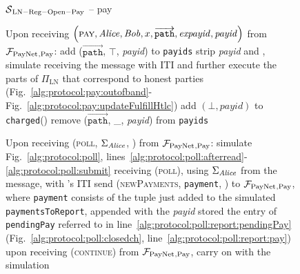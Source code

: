 \begin{figure}[!htbp]
\begin{simulatorbox}{$\mathcal{S}{}_{\mathrm{LN - Reg - Open - Pay}}$ -- pay}
\begin{algorithmic}[1]
      \State Upon receiving $\left(\textsc{pay}, \mathit{Alice}, \mathit{Bob}, x,
      \overrightarrow{\mathtt{path}}, \mathit{expayid}, \mathit{payid}\right)$
      from $\mathcal{F}_{\mathrm{PayNet}}{}_{\mathrm{, Pay}}$:
      \Indent
        \State add ($\overrightarrow{\mathtt{path}}$, $\top$, \textit{payid}) to
        \texttt{payids}
        \State strip \textit{payid} and \alice, simulate receiving the message
        with \alice{} ITI and further execute the parts of $\Pi_{\mathrm{LN}}$
        that correspond to honest parties
        (Fig.~\ref{alg:protocol:pay:outofband}-
        Fig.~\ref{alg:protocol:pay:updateFulfillHtlc})
        \label{alg:sim:pay:simulate}
         
          \State add $\left(\bot, \mathit{payid}\right)$ to
          \texttt{charged}(\alice)
          \label{alg:sim:pay:failed}
          \State remove ($\overrightarrow{\mathtt{path}}$, \_, \textit{payid})
          from \texttt{payids}
        \EndIf
      \EndIndent
      \Statex

      \State Upon receiving (\textsc{poll}, $\Sigma_{\mathit{Alice}}$, \alice) from
      $\mathcal{F}_{\mathrm{PayNet}}{}_{\mathrm{, Pay}}$:
      \Indent
        \State simulate Fig.~\ref{alg:protocol:poll},
        lines~\ref{alg:protocol:poll:afterread}-\ref{alg:protocol:poll:submit}
        receiving (\textsc{poll}), using $\Sigma_{\mathit{Alice}}$ from the message,
        with \alice's ITI
        \label{alg:sim:poll:run}
        \label{alg:sim:poll:report:if}
          \State send (\textsc{newPayments}, \texttt{payment}, \alice) to
          $\mathcal{F}_{\mathrm{PayNet}}{}_{\mathrm{, Pay}}$, where \texttt{payment} consists of the
          tuple just added to the simulated \texttt{paymentsToReport}, appended
          with the \textit{payid} stored the entry of \texttt{pendingPay}
          referred to in line~\ref{alg:protocol:poll:report:pendingPay}
          (Fig.~\ref{alg:protocol:poll:closedch},
          line~\ref{alg:protocol:poll:report:pay})
          \label{alg:sim:poll:report}
          \State upon receiving (\textsc{continue}) from $\mathcal{F}_{\mathrm{PayNet}}{}_{\mathrm{,
          Pay}}$, carry on with the simulation
        \EndIf
      \EndIndent
    \end{algorithmic}
  \end{simulatorbox}
  \caption{}
  \label{alg:sim:pay}
\end{figure}

